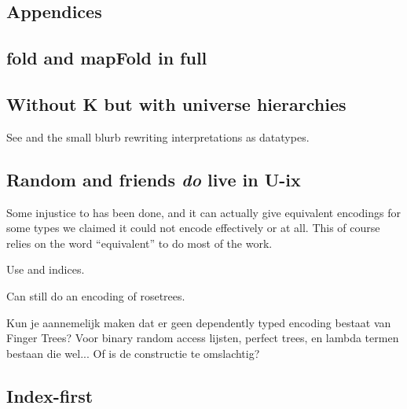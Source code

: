 
\begin{appendix}
\section*{Appendices}
\renewcommand{\thesubsection}{\Alph{subsection}}
    

\subsection{fold and mapFold in full}\label{app:gfold}



\subsection{Without K but with universe hierarchies}\label{app:withoutk}


See \cite{practgen} and the small blurb rewriting interpretations as datatypes.

\subsection{Random and friends \textit{do} live in U-ix}\label{app:unnested}
Some injustice to  has been done, and it can actually give equivalent encodings for some types we claimed it could not encode effectively or at all. This of course relies on the word ``equivalent'' to do most of the work.

Use  and indices.

Can still do an encoding of rosetrees.


\begin{outline}
Kun je aannemelijk maken dat er geen dependently typed encoding bestaat van Finger Trees? Voor binary random access lijsten, perfect trees, en lambda termen bestaan die wel... Of is de constructie te omslachtig?
\end{outline}

\subsection{Index-first}


\end{appendix}

